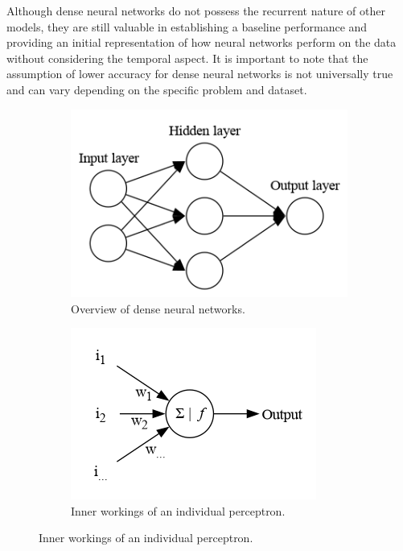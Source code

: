 Although dense neural networks do not possess the recurrent nature of other models, they are still valuable in establishing a baseline performance and providing an initial representation of how neural networks perform on the data without considering the temporal aspect. It is important to note that the assumption of lower accuracy for dense neural networks is not universally true and can vary depending on the specific problem and dataset.

\begin{figure}[h]
	\centering
	\begin{subfigure}[b]{0.4\linewidth}
		\includegraphics[width=\linewidth]{figures/overview-dense}
		\caption{Overview of dense neural networks.}
		\label{fig:overview-dense}
	\end{subfigure}
	\hfill
	\begin{subfigure}[b]{0.5\linewidth}
		\includegraphics[width=\textwidth, keepaspectratio]{figures/overview-perceptron}
		\caption{Inner workings of an individual perceptron.}
		\label{fig:overview-perceptron}
	\end{subfigure}
\end{figure}

